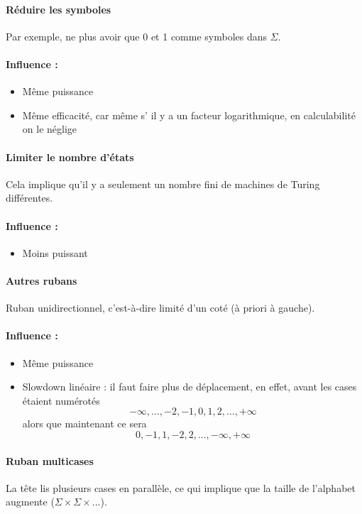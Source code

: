 \paragraph{Réduire les symboles} Par exemple, ne plus avoir que 0 et 1 comme
symboles dans $\Sigma$.

\paragraph{Influence :} 
\begin{itemize}
	\item Même puissance
	\item Même efficacité, car même s’ il y a un facteur logarithmique, en 
		calculabilité on le néglige
\end{itemize}

\paragraph{Limiter le nombre d'états} Cela implique qu'il y a seulement un nombre fini 
de machines de Turing différentes.

\paragraph{Influence :} 
\begin{itemize}
	\item Moins puissant
\end{itemize}

\paragraph{Autres rubans}

Ruban unidirectionnel, c'est-à-dire limité d'un coté (à priori à gauche).

\paragraph{Influence :} 
\begin{itemize}
	\item Même puissance
	\item Slowdown linéaire : il faut faire plus de déplacement, en 
		effet, avant les cases étaient numérotés 
		$$-\infty,...,-2,-1,0,1,2,...,+\infty$$
		alors que maintenant ce sera
	    $$0,-1,1,-2,2,...,-\infty,+\infty$$
\end{itemize}

\paragraph{Ruban multicases} La tête lis plusieurs cases en parallèle, ce qui 
implique que la taille de l'alphabet augmente ($\Sigma \times \Sigma \times ...$).

